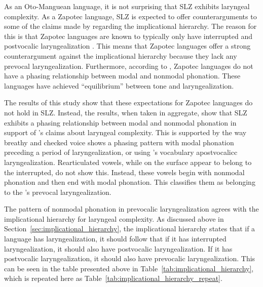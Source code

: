 As an Oto-Manguean language, it is not surprising that SLZ exhibits laryngeal complexity. As a Zapotec language, SLZ is expected to offer counterarguments to some of the claims made by \citet{silvermanLaryngealComplexityOtomanguean1997,silvermanPhasingRecoverability1997} regarding the implicational hierarchy. The reason for this is that Zapotec languages are known to typically only have interrupted and postvocalic laryngealization \citep{arellanesarellanesSistemaFonologicoPropiedades2009,arellanesarellanesDosGradosLaringizacion2010,ariza-garciaPhonationTypesTones2018,avelinoTopicsYalalagZapotec2004,avelinoAcousticElectroglottographicAnalyses2010,espositoSantaAnaValle2004,espositoVariationContrastivePhonation2010}. This means that Zapotec languages offer a strong counterargument against the implicational hierarchy because they lack any prevocal laryngealization. Furthermore, according to \citet{herrerazendejasAmuzgoZapotecTwo2000}, Zapotec languages do not have a phasing relationship between modal and nonmodal phonation. These languages have achieved ``equilibrium'' between tone and laryngealization. 

The results of this study show that these expectations for Zapotec languages do not hold in SLZ. Instead, the results, when taken in aggregate, show that SLZ exhibits a phasing relationship between modal and nonmodal phonation in support of \citeauthor{silvermanLaryngealComplexityOtomanguean1997}'s \citeyear{silvermanLaryngealComplexityOtomanguean1997,silvermanPhasingRecoverability1997} claims about laryngeal complexity. This is supported by the way breathy and checked voice shows a phasing pattern with modal phonation preceding a period of laryngealization, or using \citeauthor{silvermanLaryngealComplexityOtomanguean1997}'s \citeyear{silvermanLaryngealComplexityOtomanguean1997} vocabulary apostvocalicc laryngealization. Rearticulated vowels, while on the surface appear to belong to the interrupted, do not show this. Instead, these vowels begin with nonmodal phonation and then end with modal phonation. This classifies them as belonging to the \citeauthor{silvermanLaryngealComplexityOtomanguean1997}'s \citeyear{silvermanLaryngealComplexityOtomanguean1997} prevocal laryngealization. 

The pattern of nonmodal phonation in prevocalic laryngealization agrees with the implicational hierarchy for laryngeal complexity. As discussed above in Section~\ref{sec:implicational_hierarchy}, the implicational hierarchy states that if a language has laryngealization, it should follow that if it has interrupted laryngealization, it should also have postvocalic laryngealization. If it has postvocalic laryngealization, it should also have prevocalic laryngealization. This can be seen in the table presented above in Table~\ref{tab:implicational_hierarchy}, which is repeated here as Table~\ref{tab:implicational_hierarchy_repeat}.

